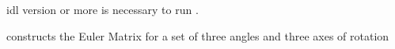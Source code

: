 \begin{related}
  \begin{sulist}{} %
    \item[idl] version \idlversion or more is necessary to run \thedocid.
    \item[\htmlref{euler\_matrix\_new}{idl:euler_matrix_new}] constructs the Euler Matrix for a set of
    three angles and three axes of rotation
  \end{sulist}
\end{related}


